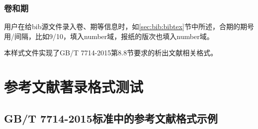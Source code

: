 \subsubsection{卷和期}\label{sec:fmt:volnum}
\begin{property}{}{}%
用户在给bib源文件录入卷、期等信息时，如\ref{sec:bib:bibtex}节中所述，合期的期号用/间隔，比如9/10，填入number域，报纸的版次也填入number域。

本样式文件实现了GB/T 7714-2015第8.8节要求的析出文献相关格式。
\end{property}




\section{参考文献著录格式测试}

\subsection{GB/T 7714-2015标准中的参考文献格式示例}\label{sec:eg:gb77142015}

